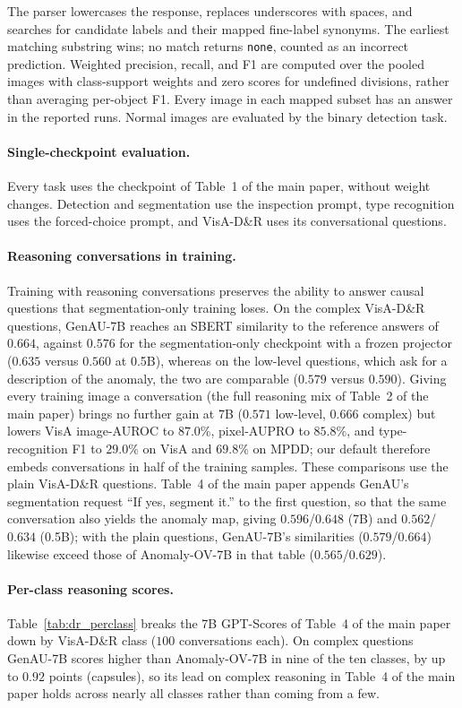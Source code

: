 The parser lowercases the response, replaces underscores with spaces, and searches for candidate labels and their mapped fine-label synonyms. The earliest matching substring wins; no match returns \texttt{none}, counted as an incorrect prediction. Weighted precision, recall, and F1 are computed over the pooled images with class-support weights and zero scores for undefined divisions, rather than averaging per-object F1. Every image in each mapped subset has an answer in the reported runs. Normal images are evaluated by the binary detection task.

\paragraph{Single-checkpoint evaluation.}
Every task uses the checkpoint of Table~1 of the main paper, without weight changes. Detection and segmentation use the inspection prompt, type recognition uses the forced-choice prompt, and VisA-D\&R uses its conversational questions.

\paragraph{Reasoning conversations in training.}
Training with reasoning conversations preserves the ability to answer causal questions that segmentation-only training loses. On the complex VisA-D\&R questions, GenAU-7B reaches an SBERT similarity to the reference answers of $0.664$, against $0.576$ for the segmentation-only checkpoint with a frozen projector ($0.635$ versus $0.560$ at 0.5B), whereas on the low-level questions, which ask for a description of the anomaly, the two are comparable ($0.579$ versus $0.590$). Giving every training image a conversation (the full reasoning mix of Table~2 of the main paper) brings no further gain at 7B ($0.571$ low-level, $0.666$ complex) but lowers VisA image-AUROC to $87.0\%$, pixel-AUPRO to $85.8\%$, and type-recognition F1 to $29.0\%$ on VisA and $69.8\%$ on MPDD; our default therefore embeds conversations in half of the training samples. These comparisons use the plain VisA-D\&R questions. Table~4 of the main paper appends GenAU's segmentation request ``If yes, segment it.'' to the first question, so that the same conversation also yields the anomaly map, giving $0.596$/$0.648$ (7B) and $0.562$/$0.634$ (0.5B); with the plain questions, GenAU-7B's similarities ($0.579$/$0.664$) likewise exceed those of Anomaly-OV-7B in that table ($0.565$/$0.629$).

\paragraph{Per-class reasoning scores.}
Table~\ref{tab:dr_perclass} breaks the 7B GPT-Scores of Table~4 of the main paper down by VisA-D\&R class ($100$ conversations each). On complex questions GenAU-7B scores higher than Anomaly-OV-7B in nine of the ten classes, by up to $0.92$ points (capsules), so its lead on complex reasoning in Table~4 of the main paper holds across nearly all classes rather than coming from a few.

